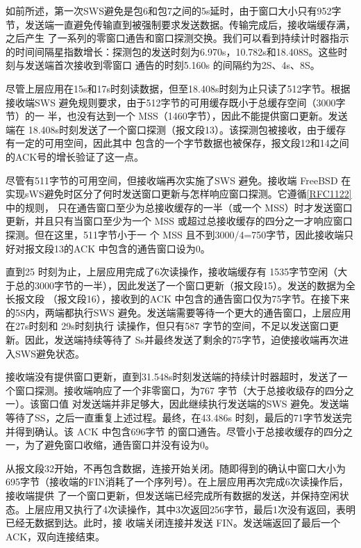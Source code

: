 如前所述，第一次SWS避免是包6和包7之间的5s延时，由于窗口大小只有952字节，发送端一直避免传输直到被强制要求发送数据。传输完成后，接收端缓存满，之后产生
了一系列的零窗口通告和窗口探测交换。我们可以看到持续计时器指示的时间间隔星指数增长：探测包的发送时刻为6.970s，10.782s和18.408S。这些时刻与发送端首次接收到零窗口
通告的时刻5.160s 的间隔约为2S、4s、8S。

尽管上层应用在15s和17s时刻读数据，但至18.408s时刻为止只读了512字节。根据接收端SWS 避免规则要求，由于512字节的可用缓存既小于总缓存空间（3000字节）的一
半，也没有达到一个 MSS（1460字节），因此不能提供窗口更新。发送端在 18.408s时刻发送了一个窗口探测（报文段13）。该探测包被接收，由于缓存有一定的可用空间，因此其中
包含的一个字节数据也被保存，报文段12和14之间的ACK号的增长验证了这一点。

尽管有511字节的可用空间，但接收端再次实施了SWS 避免。接收端 FreeBSD 在实现sWS避免时区分了何时发送窗口更新与怎样响应窗口探测。它遵循\href{https://www.rfc-editor.org/rfc/rfc1122}{[RFC1122]} 中的规则，
只在通告窗口至少为总接收缓存的一半（或一个 MSS）时才发送窗口更新，并且只有当窗口至少为一个 MSS 或超过总接收缓存的四分之一才响应窗口探测。但在这里，511字节小于一
个 MSS 且不到3000/4=750字节，因此接收端只好对报文段13的ACK 中包含的通告窗口设为0。

直到25 时刻为止，上层应用完成了6次读操作，接收端缓存有 1535字节空闲（大于总的3000字节的一半），因此发送了一个窗口更新（报文段15）。发送的数据为全长报文段
（报文段16），接收到的ACK 中包含的通告窗口仅为75字节。在接下来的5S内，两端都执行SWS 避免。发送端需要等待一个更大的通告窗口，上层应用在27s时刻和 29s时刻执行
读操作，但只有587 字节的空间，不足以发送窗口更新。因此，发送端持续等待了 Ss并最终发送了剩余的75字节，迫使接收端再次进入SWS避免状态。

接收端没有提供窗口更新，直到31.548s时刻发送端的持续计时器超时，发送了一个窗口探测。接收端响应了一个非零窗口，为767 字节（大于总接收级存的四分之一）。该窗口值
对发送端并非足够大，因此继续执行发送端的SWS 避免。发送端等待了SS，之后一直重复上述过程。最终，在43.486s 时刻，最后的71字节发送完并得到确认。该 ACK 中包含696字节
的窗口通告。尽管小于总接收缓存的四分之一，为了避免窗口收缩，通告窗口并没有设为0。

从报文段32开始，不再包含数据，连接开始关闭。随即得到的确认中窗口大小为695字节（接收端的FIN消耗了一个序列号）。在上层应用再次完成6次读操作后，接收端提供
了一个窗口更新，但发送端已经完成所有数据的发送，并保持空闲状态。上层应用又执行了4次读操作，其中3次返回256字节，最后1次没有返回，表明已经无数据到达。此时，接
收端关闭连接并发送 FIN。发送端返回了最后一个 ACK，双向连接结束。

